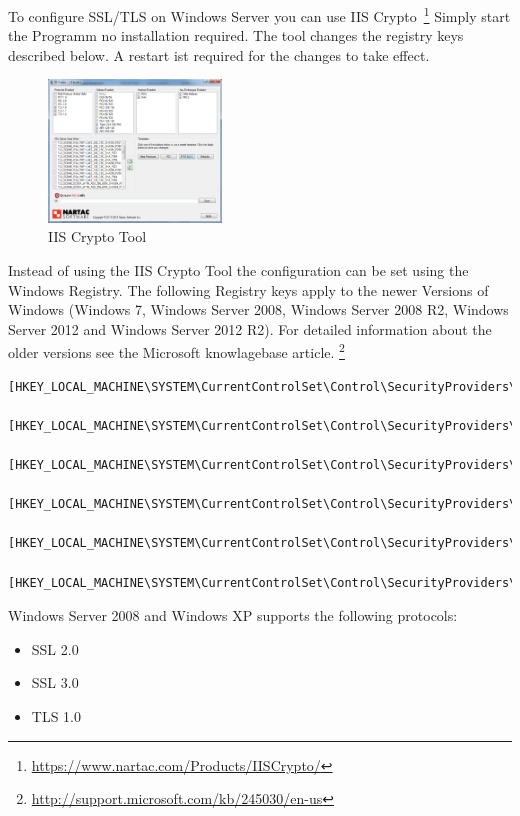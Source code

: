 To configure SSL/TLS on Windows Server you can use IIS Crypto~\footnote{\url{https://www.nartac.com/Products/IISCrypto/}}
Simply start the Programm no installation required. The tool changes the registry keys described below.
A restart ist required for the changes to take effect.

\begin{figure}[p]
  \centering
  \includegraphics[width=0.411\textwidth]{img/IISCryptoFIPS1402.png}
  \caption{IIS Crypto Tool}
  \label{fig:IISCryptoFIPS1402}
\end{figure}

Instead of using the IIS Crypto Tool the configuration can be set
using the Windows Registry. The following Registry keys apply to the
newer Versions of Windows (Windows 7, Windows Server 2008, Windows
Server 2008 R2, Windows Server 2012 and Windows Server 2012 R2). For detailed
information about the older versions see the Microsoft knowlagebase
article. \footnote{\url{http://support.microsoft.com/kb/245030/en-us}}
\begin{lstlisting}[breaklines]
  [HKEY_LOCAL_MACHINE\SYSTEM\CurrentControlSet\Control\SecurityProviders\Schannel] 
  [HKEY_LOCAL_MACHINE\SYSTEM\CurrentControlSet\Control\SecurityProviders\Schannel\Ciphers] 
  [HKEY_LOCAL_MACHINE\SYSTEM\CurrentControlSet\Control\SecurityProviders\Schannel\CipherSuites] 
  [HKEY_LOCAL_MACHINE\SYSTEM\CurrentControlSet\Control\SecurityProviders\Schannel\Hashes] 
  [HKEY_LOCAL_MACHINE\SYSTEM\CurrentControlSet\Control\SecurityProviders\Schannel\KeyExchangeAlgorithms] 
  [HKEY_LOCAL_MACHINE\SYSTEM\CurrentControlSet\Control\SecurityProviders\Schannel\Protocols] 
\end{lstlisting}

Windows Server 2008 and Windows XP supports the following protocols:
\begin{itemize}
\item SSL 2.0
\item SSL 3.0
\item TLS 1.0
\end{itemize}

